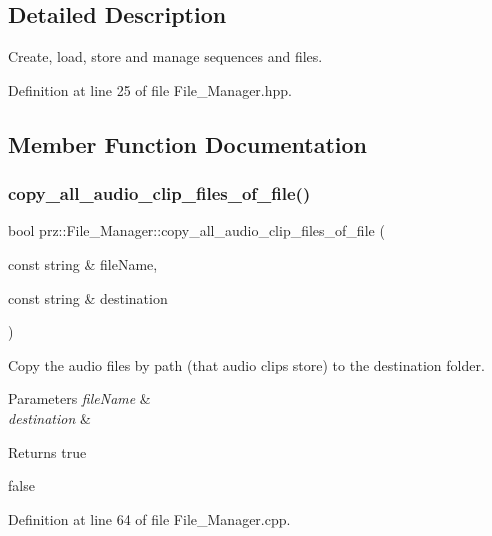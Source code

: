 \subsection{Detailed Description}
Create, load, store and manage sequences and files. 



Definition at line 25 of file File\+\_\+\+Manager.\+hpp.



\subsection{Member Function Documentation}
\mbox{\label{classprz_1_1_file___manager_a56563f65f4b2cfa34e4393ae34a0afd3}} 
\subsubsection{\texorpdfstring{copy\_all\_audio\_clip\_files\_of\_file()}{copy\_all\_audio\_clip\_files\_of\_file()}}
{\footnotesize\ttfamily bool prz\+::\+File\+\_\+\+Manager\+::copy\+\_\+all\+\_\+audio\+\_\+clip\+\_\+files\+\_\+of\+\_\+file (\begin{DoxyParamCaption}\item[{const string \&}]{file\+Name,  }\item[{const string \&}]{destination }\end{DoxyParamCaption})}



Copy the audio files by path (that audio clips store) to the destination folder. 


\begin{DoxyParams}{Parameters}
{\em file\+Name} & \\
\hline
{\em destination} & \\
\hline
\end{DoxyParams}
\begin{DoxyReturn}{Returns}
true 

false 
\end{DoxyReturn}


Definition at line 64 of file File\+\_\+\+Manager.\+cpp.

